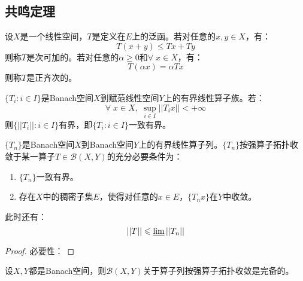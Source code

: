 \subsection{共鸣定理}
\begin{definition}
	设$X$是一个线性空间，$T$是定义在$E$上的泛函。若对任意的$x,y\in X$，有：
	\begin{equation*}
		T(x+y)\leqslant Tx+Ty
	\end{equation*}
	则称$T$是次可加的。若对任意的$\alpha\geqslant0$和$\forall\;x\in X$，有：
	\begin{equation*}
		T(\alpha x)=\alpha Tx
	\end{equation*}
	则称$T$是正齐次的。
\end{definition}
\begin{theorem}
	$\{T_i:i\in I\}$是Banach空间$X$到赋范线性空间$Y$上的有界线性算子族。若：
	\begin{equation*}
		\forall\;x\in X,\;\sup_{i\in I}||T_ix||<+\infty
	\end{equation*}
	则$\{||T_i||:i\in I\}$有界，即$\{T_i:i\in I\}$一致有界。
\end{theorem}
\begin{theorem}
	$\{T_n\}$是Banach空间$X$到Banach空间$Y$上的有界线性算子列。$\{T_n\}$按强算子拓扑收敛于某一算子$T\in\mathscr{B}(X,Y)$的充分必要条件为：
	\begin{enumerate}
		\item $\{T_n\}$一致有界。
		\item 存在$X$中的稠密子集$E$，使得对任意的$x\in E$，$\{T_nx\}$在$Y$中收敛。
	\end{enumerate}
	此时还有：
	\begin{equation*}
		||T||\leqslant\varliminf||T_n||
	\end{equation*}
\end{theorem}
\begin{proof}
	必要性：
\end{proof}
\begin{theorem}
	设$X,Y$都是Banach空间，则$\mathscr{B}(X,Y)$关于算子列按强算子拓扑收敛是完备的。
\end{theorem}